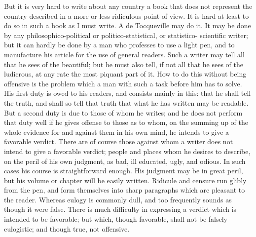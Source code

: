 But it is very hard to write about any country a book that does not
represent the country described in a more or less ridiculous point
of view.  It is hard at least to do so in such a book as I must
write.  A de Tocqueville may do it.  It may be done by any
philosophico-political or politico-statistical, or statistico-
scientific writer; but it can hardly be done by a man who professes
to use a light pen, and to manufacture his article for the use of
general readers.  Such a writer may tell all that he sees of the
beautiful; but he must also tell, if not all that he sees of the
ludicrous, at any rate the most piquant part of it.  How to do this
without being offensive is the problem which a man with such a task
before him has to solve.  His first duty is owed to his readers,
and consists mainly in this: that he shall tell the truth, and
shall so tell that truth that what he has written may be readable.
But a second duty is due to those of whom he writes; and he does
not perform that duty well if he gives offense to those as to whom,
on the summing up of the whole evidence for and against them in his
own mind, he intends to give a favorable verdict.  There are of
course those against whom a writer does not intend to give a
favorable verdict; people and places whom he desires to describe,
on the peril of his own judgment, as bad, ill educated, ugly, and
odious.  In such cases his course is straightforward enough.  His
judgment may be in great peril, but his volume or chapter will be
easily written.  Ridicule and censure run glibly from the pen, and
form themselves into sharp paragraphs which are pleasant to the
reader.  Whereas eulogy is commonly dull, and too frequently sounds
as though it were false.  There is much difficulty in expressing a
verdict which is intended to be favorable; but which, though
favorable, shall not be falsely eulogistic; and though true, not
offensive.

